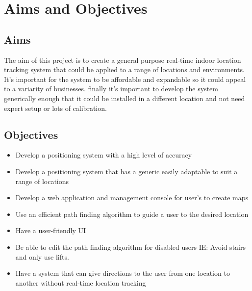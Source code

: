 \section{Aims and Objectives}\label{aimssandobj}
		\subsection{Aims}
		The aim of this project is to create a general purpose real-time indoor location tracking system that could be applied to a range of locations and environments. It's important for the system  to be affordable and expandable so it could appeal to a variarity of businesses. finally it's important to develop the system generically enough that it could be installed in a different location and not need expert setup or lots of calibration.

		\subsection{Objectives}
		\begin{itemize}
			\item Develop a positioning system with a high level of accuracy
			\item Develop a positioning system that has a generic easily adaptable to suit a range of locations
			\item Develop a web application and management console for user’s to create maps
			\item Use an efficient path finding algorithm to guide a user to the desired location
			\item Have a user-friendly UI
			\item Be able to edit the path finding algorithm for disabled users IE: Avoid stairs and only use lifts.
			\item Have a system that can give directions to the user from one location to another without real-time location tracking
		\end{itemize}
		\newpage